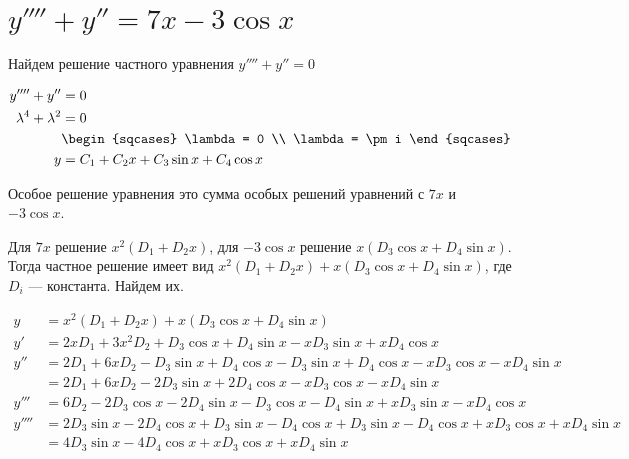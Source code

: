 

\cfoot{}
\usepackage{float}\usepackage{subcaption}\usepackage{svg}



\section{\(y'''' + y'' = 7x - 3\cos x\)}

Найдем решение частного уравнения \(y'''' + y'' = 0\)

\begin{align*}
    y'''' + y''           & = 0                                  \\
    \lambda^4 + \lambda^2 & = 0                                  \\
                          & \begin{sqcases}
        \lambda = 0 \\
        \lambda = \pm i
    \end{sqcases}            \\
    y                     & = C_1 + C_2x + C_3\sin x + C_4\cos x \\
\end{align*}

Особое решение уравнения это сумма особых решений уравнений с \(7x\) и \( - 3\cos x\).

Для \(7x\) решение \(x^2(D_1 + D_2 x)\), для \( - 3\cos x\) решение \(x(D_3\cos x + D_4\sin x)\). Тогда частное решение имеет вид \(x^2(D_1 + D_2 x) + x(D_3\cos x + D_4\sin x)\), где \(D_i\) --- константа. Найдем их.

\begin{align*}
    y     & = x^2(D_1 + D_2 x) + x(D_3\cos x + D_4\sin x)                                                       \\
    y'    & = 2x D_1 + 3x^2 D_2 + D_3\cos x + D_4\sin x - xD_3\sin x + xD_4\cos x                               \\
    y''   & = 2 D_1 + 6x D_2 - D_3\sin x + D_4\cos x - D_3\sin x + D_4\cos x - xD_3\cos x - xD_4\sin x          \\
          & = 2 D_1 + 6x D_2 - 2D_3\sin x + 2D_4\cos x - xD_3\cos x - xD_4\sin x                                \\
    y'''  & = 6 D_2 - 2D_3\cos x - 2D_4\sin x - D_3\cos x - D_4\sin x + xD_3\sin x - xD_4\cos x                 \\
    y'''' & = 2D_3\sin x - 2D_4\cos x + D_3\sin x - D_4\cos x + D_3\sin x - D_4\cos x + xD_3\cos x + xD_4\sin x \\
          & = 4D_3\sin x - 4D_4\cos x + xD_3\cos x + xD_4\sin x                                                 \\
\end{align*}

